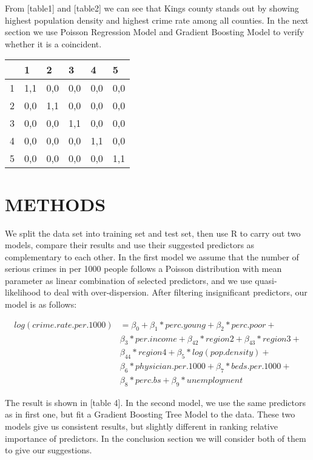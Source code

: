 \documentclass[preprint,12pt,3p]{elsarticle}
\begin{document}
From [table1] and [table2] we can see that Kings county stands out by showing highest population density and highest crime rate among all counties. In the next section we use Poisson Regression Model and Gradient Boosting Model to verify whether it is a coincident.


\begin{center}
\begin{tabular}{ P{1cm}P{1cm}P{1cm}P{1cm}P{1cm}P{1cm}}
{} & 1 & 2 & 3 & 4 & 5 \\
 &1,1 &0,0 &0,0 &0,0 &0,0\\
2 &0,0 &1,1 &0,0 &0,0 &0,0\\
3 &0,0 &0,0 &1,1 &0,0 &0,0\\
4 &0,0 &0,0 &0,0 &1,1 &0,0\\
5 &0,0 &0,0 &0,0 &0,0 &1,1\\
\end{tabular}
\end{center}


\section{METHODS}
\label{sec2}
We split the data set into training set and test set, then use R to carry out two models, compare their results and use their suggested predictors as complementary to each other.
In the first model we assume that the number of serious crimes in per 1000 people follows a Poisson distribution with mean parameter as linear combination of selected predictors, and we use quasi-likelihood to deal with over-dispersion. After filtering insignificant predictors, our model is as follows:

\begin{align}
log(crime.rate.per.1000) &= \beta_{0} + \beta_{1}*perc.young + \beta_{2}*perc.poor +\nonumber\\
                         &\beta_{3}*per.income + \beta_{42}*region2 + \beta_{43}*region3 +\nonumber\\
  &\beta_{44}*region4 +\beta_{5}*log(pop.density) +\nonumber\\
  &\beta_{6}*physician.per.1000 + \beta_{7}*beds.per.1000 +\nonumber\\
  &\beta_{8}*perc.bs + \beta_{9}*unemployment\nonumber
\end{align}


The result is shown in [table 4].
In the second model, we use the same predictors as in first one, but fit a Gradient Boosting Tree Model to the data.
These two models give us consistent results, but slightly different in ranking relative importance of predictors. In the conclusion section we will consider both of them to give our suggestions.
\end{document}

